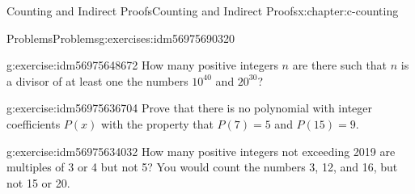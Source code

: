 \documentclass[twoside,10pt,]{book}
\numberwithin{equation}{section}
\begin{document}
\begin{chapterptx}{Counting and Indirect Proofs}{}{Counting and Indirect Proofs}{}{}{x:chapter:c-counting}
\begin{exercises-section}{Problems}{}{Problems}{}{}{g:exercises:idm56975690320}
\begin{divisionexercise}{7}{}{}{g:exercise:idm56975648672}
How many positive integers \(n\) are there such that \(n\) is a divisor of at least one the numbers \(10^{40}\) and \(20^{30}\)?%
\end{divisionexercise}%
\begin{divisionexercise}{8}{}{}{g:exercise:idm56975636704}%
Prove that there is no polynomial with integer coefficients \(P(x)\) with the property that \(P(7) = 5\) and \(P(15) = 9\).%
\end{divisionexercise}%
\begin{divisionexercise}{9}{}{}{g:exercise:idm56975634032}%
How many positive integers not exceeding 2019 are multiples of 3 or 4 but not 5? You would count the numbers 3, 12, and 16, but not 15 or 20.%
\end{divisionexercise}%
\end{exercises-section}
\end{chapterptx}
%
%
\typeout{************************************************}
\typeout{************************************************}
%
\end{document}

